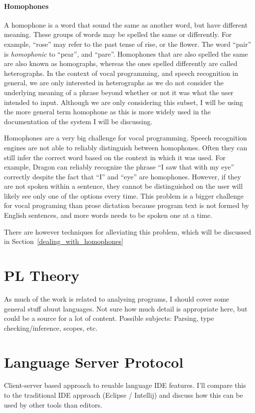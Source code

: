 \documentclass[a4paper,english]{ifimaster}
\begin{document}
\paragraph{Homophones}
A homophone is a word that sound the same as another word, but have different meaning.
These groups of words may be spelled the same or differently.
For example, ``rose'' may refer to the past tense of rise, or the flower.
The word ``pair'' is \textit{homophonic} to ``pear'', and ``pare''.
Homophones that are also spelled the same are also known as homographs, whereas the ones spelled differently are called heterographs.
In the context of vocal programming, and speech recognition in general, we are only interested in heterographs as we do not consider
the underlying meaning of a phrase beyond whether or not it was what the user intended to input.
Although we are only considering this subset, I will be using the more general term homophone as this is more widely used in the documentation
of the system I will be discussing.

Homophones are a very big challenge for vocal programming.
Speech recognition engines are not able to reliably distinguish between homophones.
Often they can still infer the correct word based on the context in which it was used.
For example, Dragon can reliably recognize the phrase ``I saw that with my eye'' correctly despite the fact that ``I'' and ``eye'' are homophones.
However, if they are not spoken within a sentence, they cannot be distinguished on the user will likely see only one of the options every time.
This problem is a bigger challenge for vocal programing than prose dictation because program text is not formed by English sentences, and more words needs to be
spoken one at a time.

There are however techniques for alleviating this problem, which will be discussed in Section~\ref{dealing_with_homophones}



\section{PL Theory}
As much of the work is related to analysing programs, I should cover some general stuff abuut languages.
Not sure how much detail is appropriate here, but could be a source for a lot of content.
Possible subjects: Parsing, type checking/inference, scopes, etc.

\section{Language Server Protocol}
Client-server based approach to reuable language IDE features.
I'll compare this to the traditional IDE approach (Eclipse / Intellij)
and discuss how this can be used by other tools than editors.
\end{document}
